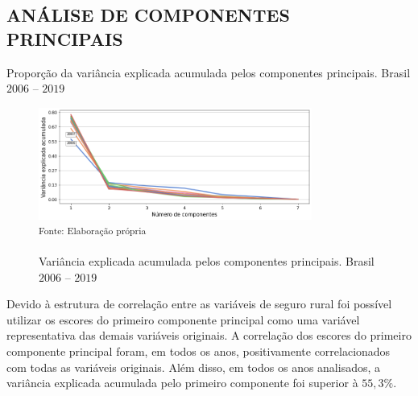 \subsection{ANÁLISE DE COMPONENTES PRINCIPAIS} 

\begin{small}
\begin{table}[H]
\caption{Proporção da variância explicada acumulada pelos componentes principais. Brasil $2006$ -- $2019$} \label{tab_var_ratio}

\end{table}
\end{small}


\begin{figure}[H]
	\centering
	\caption{Variância explicada acumulada pelos componentes principais. Brasil $2006$ -- $2019$}
	\includegraphics[width=0.8\textwidth]{figuras/var_radio.png}\\
	\small \textsuperscript {Fonte: Elaboração própria}
    \label{var_ratio}
\end{figure}

Devido à estrutura de correlação entre as variáveis de seguro rural foi possível utilizar os escores do primeiro componente principal como uma variável representativa das demais variáveis originais. A correlação dos escores do primeiro componente principal foram, em todos os anos, positivamente correlacionados com todas as variáveis originais. Além disso, em todos os anos analisados, a variância explicada acumulada pelo primeiro componente foi superior à $55,3\%$. 


